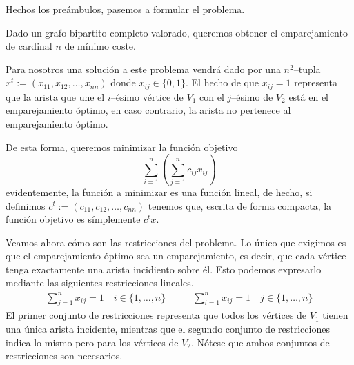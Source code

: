 Hechos los preámbulos, pasemos a formular el problema.
\begin{prob}
	Dado un grafo bipartito completo valorado, queremos obtener el emparejamiento de cardinal $n$ de mínimo coste.
	
	Para nosotros una solución a este problema vendrá dado por una $n^2$--tupla $x^t:=(x_{11},x_{12},\dots,x_{nn})$ donde $x_{ij}\in\{0,1\}$. El hecho de que $x_{ij}=1$ representa que la arista que une el $i$--ésimo vértice de $V_1$ con el $j$--ésimo de $V_2$ está en el emparejamiento óptimo, en caso contrario, la arista no pertenece al emparejamiento óptimo.
	
	De esta forma, queremos minimizar la función objetivo
	\begin{equation*}
		\sum_{i=1}^{n}\left(\sum_{j=1}^{n}c_{ij}x_{ij}\right)
	\end{equation*}
	evidentemente, la función a minimizar es una función lineal, de hecho, si definimos $c^t:=(c_{11},c_{12},\dots,c_{nn})$ tenemos que, escrita de forma compacta, la función objetivo es símplemente $c^tx$.
\end{prob}
Veamos ahora cómo son las restricciones del problema. Lo único que exigimos es que el emparejamiento óptimo sea un emparejamiento, es decir, que cada vértice tenga exactamente una arista incidiento sobre él. Esto podemos expresarlo mediante las siguientes restricciones lineales.
\begin{equation*}
	\begin{array}{cc}
	\displaystyle{\sum_{j=1}^{n}x_{ij}=1\quad i\in\{1,\dots,n\}}\qquad&\displaystyle{\sum_{i=1}^{n}x_{ij}=1\quad j\in\{1,\dots,n\}}
	\end{array}
\end{equation*}
El primer conjunto de restricciones representa que todos los vértices de $V_1$ tienen una única arista incidente, mientras que el segundo conjunto de restricciones indica lo mismo pero para los vértices de $V_2$. Nótese que ambos conjuntos de restricciones son necesarios.

